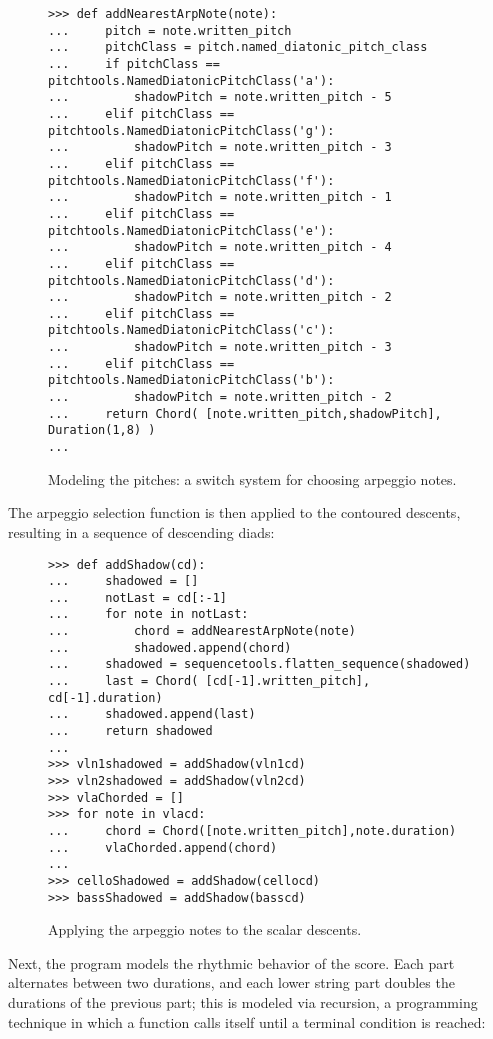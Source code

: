 \begin{figure}[H] 
\begin{lstlisting}[basicstyle=\scriptsize\ttfamily, breaklines=True, tabsize=4, showtabs=false, showspaces=false]
>>> def addNearestArpNote(note):
...     pitch = note.written_pitch
...     pitchClass = pitch.named_diatonic_pitch_class
...     if pitchClass == pitchtools.NamedDiatonicPitchClass('a'):
... 	    shadowPitch = note.written_pitch - 5
...     elif pitchClass == pitchtools.NamedDiatonicPitchClass('g'):
... 	    shadowPitch = note.written_pitch - 3
...     elif pitchClass == pitchtools.NamedDiatonicPitchClass('f'):
... 	    shadowPitch = note.written_pitch - 1
...     elif pitchClass == pitchtools.NamedDiatonicPitchClass('e'):
...         shadowPitch = note.written_pitch - 4
...     elif pitchClass == pitchtools.NamedDiatonicPitchClass('d'):
...         shadowPitch = note.written_pitch - 2
...     elif pitchClass == pitchtools.NamedDiatonicPitchClass('c'):
...         shadowPitch = note.written_pitch - 3
...     elif pitchClass == pitchtools.NamedDiatonicPitchClass('b'):
...         shadowPitch = note.written_pitch - 2
...     return Chord( [note.written_pitch,shadowPitch], Duration(1,8) )
... \end{lstlisting}

\caption{Modeling the pitches: a switch system for choosing arpeggio notes. } 
\end{figure}

The arpeggio selection function is then applied to the contoured descents, resulting in a sequence of descending diads:
\begin{figure}[H] 
\begin{lstlisting}[basicstyle=\scriptsize\ttfamily, breaklines=True, tabsize=4, showtabs=false, showspaces=false]
>>> def addShadow(cd):
...     shadowed = []
...     notLast = cd[:-1]
...     for note in notLast:
... 	    chord = addNearestArpNote(note)
... 	    shadowed.append(chord)
...     shadowed = sequencetools.flatten_sequence(shadowed)
...     last = Chord( [cd[-1].written_pitch], cd[-1].duration)
...     shadowed.append(last)
...     return shadowed
... 
>>> vln1shadowed = addShadow(vln1cd)
>>> vln2shadowed = addShadow(vln2cd)
>>> vlaChorded = []
>>> for note in vlacd:
... 	chord = Chord([note.written_pitch],note.duration)
... 	vlaChorded.append(chord)
... 
>>> celloShadowed = addShadow(cellocd)
>>> bassShadowed = addShadow(basscd)\end{lstlisting}

\caption{Applying the arpeggio notes to the scalar descents. } 
\end{figure}
Next, the program models the rhythmic behavior of the score. Each part alternates between two durations, and each lower string part doubles the durations of the previous part; this is modeled via recursion, a programming technique in which a function calls itself until a terminal condition is reached:

